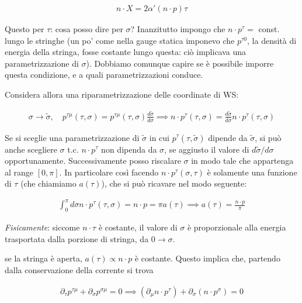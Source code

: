 \documentclass{report}
\begin{document}
\begin{align}
    n \cdot X = 2\alpha' (n\cdot p)\tau
\end{align}

Questo per \(\tau\): cosa posso dire per \(\sigma\)? Inanzitutto impongo che \(n\cdot p^\tau = \) const. lungo le stringhe (un po' come nella gauge statica imponevo che \(p^{\tau 0}\), la densità di energia della stringa, fosse costante lungo questa: ciò implicava una parametrizzazione di \(\sigma\)). Dobbiamo comunque capire se è possibile imporre questa condizione, e a quali parametrizzazioni conduce. 

Considera allora una riparametrizzazione delle coordinate di WS: 

\begin{align}
    \sigma \to \tilde{\sigma}, \quad p^{\tau \mu}(\tau, \sigma) = p^{\tau \mu}(\tau, \sigma)\frac{d\tilde{\sigma}}{d\sigma} \implies n\cdot p^{\tau}(\tau, \sigma) = \frac{d\tilde{\sigma}}{d\sigma}n\cdot p^\tau (\tau, \sigma)
\end{align}

Se si sceglie una parametrizzazione di \(\tilde{\sigma}\) in cui \(p^\tau(\tau, \tilde{\sigma})\) dipende da \(\tilde{\sigma}\), si può anche scegliere \(\sigma\) t.c. \(n\cdot p^\tau\) non dipenda da \(\sigma\), se aggiusto il valore di \(d\tilde{\sigma}/d\sigma\) opportunamente. Successivamente posso riscalare \(\sigma\) in modo tale che appartenga al range \([0, \pi]\). In particolare così facendo \(n\cdot p^\tau(\sigma, \tau)\) è solamente una funzione di \(\tau\) (che chiamiamo \(a(\tau)\)), che si può ricavare nel modo seguente: 

\begin{align}
    \int_0^\pi d\sigma n \cdot p^\tau (\tau, \sigma) = n\cdot p = \pi a(\tau) \implies a(\tau) = \frac{n\cdot p}{\pi}
\end{align}

\emph{Fisicamente}: siccome \(n\cdot \tau\) è costante, il valore di \(\sigma\) è proporzionale alla energia trasportata dalla porzione di stringa, da \(0 \to \sigma\). 


se la stringa è aperta, \(a(\tau) \propto n\cdot p\) è costante. Questo implica che, partendo dalla conservazione della corrente si trova

\begin{align}
    \partial_\tau p^{\tau \mu} + \partial_\sigma p^{\sigma \mu} = 0 \implies (\partial_\mu n\cdot p^\tau) + \partial_\sigma (n\cdot p^\sigma) = 0 
\end{align}
\end{document}
